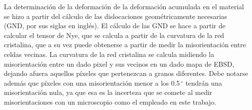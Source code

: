 La determinación de la deformación de la deformación acumulada en el material se hizo a partir del cálculo de las dislocaciones geométricamente necesarias (GND, por sus siglas en inglés).
El cálculo de las GND se hace a partir de calcular el tensor de Nye\cite{Nye1953}, que se calcula a partir de la curvatura de la red cristalina, que a su vez puede obtenerse a partir de medir la misorientación entre celdas vecinas\cite{Pantleon2008}.
La curvatura de la red cristalina se calcula midiendo la misorientación entre un dado pixel y sus vecinos en un dado mapa de EBSD, dejando afuera aquellos píxeles que pertenezcan a granos diferentes.
Debe notarse además que píxeles con una misorientación menor a los 0.5\,$^{\circ}$ tendrán una misorientación nula, ya que esa es la incerteza que se comete al medir misorientaciones con un microscopio como el empleado en este trabajo.
